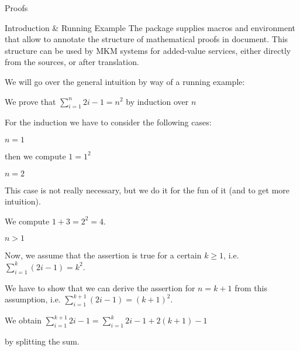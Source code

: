 \begin{sfragment}{Proofs}

\begin{sfragment}{Introduction \& Running Example}
  The  package supplies macros and environment that allow to annotate the
  structure of mathematical proofs in \sTeX document. This structure can be used by MKM
  systems for added-value services, either directly from the \sTeX sources, or after
  translation.

  We will go over the general intuition by way of a running example: 

\begin{latexcode}
\begin{sproof}[id=simple-proof]
   {We prove that $\sum_{i=1}^n{2i-1}=n^{2}$ by induction over $n$}
  \begin{spfcases}{For the induction we have to consider the following cases:}
   \begin{spfcase}{$n=1$}
    \begin{spfstep}[type=inline] then we compute $1=1^2$\end{spfstep}
   \end{spfcase}
   \begin{spfcase}{$n=2$}
      \begin{spfcomment}[type=inline]
        This case is not really necessary, but we do it for the
        fun of it (and to get more intuition).
      \end{spfcomment}
      \begin{spfstep}[type=inline] We compute $1+3=2^{2}=4$.\end{spfstep}
   \end{spfcase}
   \begin{spfcase}{$n>1$}
      \begin{spfstep}[type=assumption,id=ind-hyp]
        Now, we assume that the assertion is true for a certain $k\geq 1$,
        i.e. $\sum_{i=1}^k{(2i-1)}=k^{2}$.
      \end{spfstep}
      \begin{spfcomment}
        We have to show that we can derive the assertion for $n=k+1$ from
        this assumption, i.e. $\sum_{i=1}^{k+1}{(2i-1)}=(k+1)^{2}$.
      \end{spfcomment}
      \begin{spfstep}
        We obtain $\sum_{i=1}^{k+1}{2i-1}=\sum_{i=1}^k{2i-1}+2(k+1)-1$
        \begin{justification}[method=arith:split-sum]
          by splitting the sum.

\end{justification}
\end{spfstep}
\end{spfcase}
\end{spfcases}
\end{sproof}
\end{latexcode}
\end{sfragment}
\end{sfragment}

